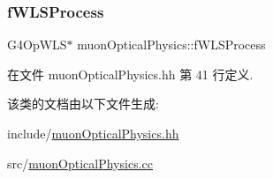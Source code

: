 \subsubsection{\texorpdfstring{f\+W\+L\+S\+Process}{fWLSProcess}}
{\footnotesize\ttfamily G4\+Op\+W\+LS$\ast$ muon\+Optical\+Physics\+::f\+W\+L\+S\+Process\hspace{0.3cm}{\ttfamily [private]}}



在文件 muon\+Optical\+Physics.\+hh 第 41 行定义.



该类的文档由以下文件生成\+:\begin{DoxyCompactItemize}
\item 
include/\hyperlink{muonOpticalPhysics_8hh}{muon\+Optical\+Physics.\+hh}\item 
src/\hyperlink{muonOpticalPhysics_8cc}{muon\+Optical\+Physics.\+cc}\end{DoxyCompactItemize}

